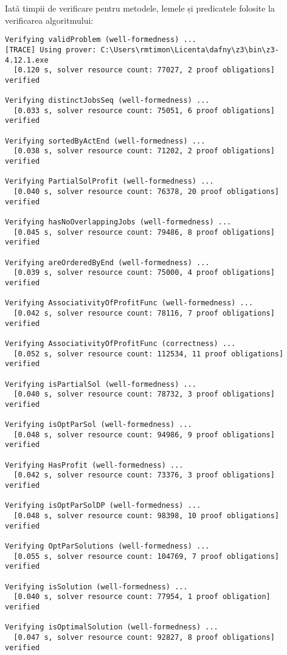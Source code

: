 Iată timpii de verificare pentru metodele, lemele și predicatele folosite la verificarea algoritmului:
\begin{Verbatim}[fontsize=\footnotesize]
Verifying validProblem (well-formedness) ...
[TRACE] Using prover: C:\Users\rmtimon\Licenta\dafny\z3\bin\z3-4.12.1.exe
  [0.120 s, solver resource count: 77027, 2 proof obligations]  verified

Verifying distinctJobsSeq (well-formedness) ...
  [0.033 s, solver resource count: 75051, 6 proof obligations]  verified

Verifying sortedByActEnd (well-formedness) ...
  [0.038 s, solver resource count: 71202, 2 proof obligations]  verified

Verifying PartialSolProfit (well-formedness) ...
  [0.040 s, solver resource count: 76378, 20 proof obligations]  verified

Verifying hasNoOverlappingJobs (well-formedness) ...
  [0.045 s, solver resource count: 79486, 8 proof obligations]  verified

Verifying areOrderedByEnd (well-formedness) ...
  [0.039 s, solver resource count: 75000, 4 proof obligations]  verified

Verifying AssociativityOfProfitFunc (well-formedness) ...
  [0.042 s, solver resource count: 78116, 7 proof obligations]  verified

Verifying AssociativityOfProfitFunc (correctness) ...
  [0.052 s, solver resource count: 112534, 11 proof obligations]  verified

Verifying isPartialSol (well-formedness) ...
  [0.040 s, solver resource count: 78732, 3 proof obligations]  verified

Verifying isOptParSol (well-formedness) ...
  [0.048 s, solver resource count: 94986, 9 proof obligations]  verified

Verifying HasProfit (well-formedness) ...
  [0.042 s, solver resource count: 73376, 3 proof obligations]  verified

Verifying isOptParSolDP (well-formedness) ...
  [0.048 s, solver resource count: 98398, 10 proof obligations]  verified

Verifying OptParSolutions (well-formedness) ...
  [0.055 s, solver resource count: 104769, 7 proof obligations]  verified

Verifying isSolution (well-formedness) ...
  [0.040 s, solver resource count: 77954, 1 proof obligation]  verified

Verifying isOptimalSolution (well-formedness) ...
  [0.047 s, solver resource count: 92827, 8 proof obligations]  verified


\end{Verbatim}
